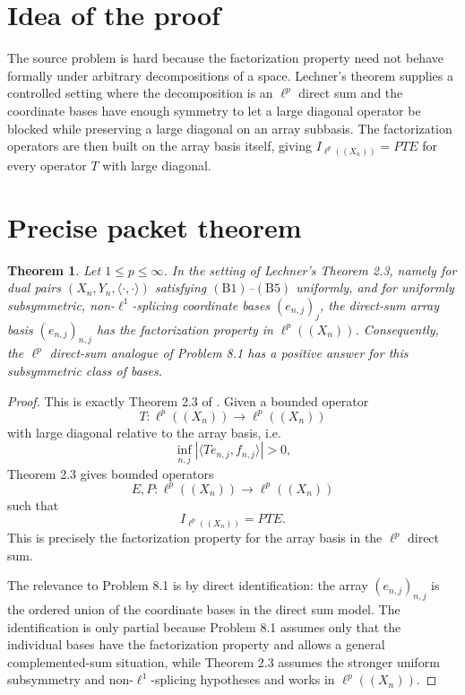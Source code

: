 \documentclass[11pt]{article}
\newtheorem{theorem}{Theorem}
\begin{document}
\section*{Idea of the proof}

The source problem is hard because the factorization property need not behave
formally under arbitrary decompositions of a space.  Lechner's theorem supplies
a controlled setting where the decomposition is an $\ell^p$ direct sum and the
coordinate bases have enough symmetry to let a large diagonal operator be
blocked while preserving a large diagonal on an array subbasis.  The
factorization operators are then built on the array basis itself, giving
$I_{\ell^p((X_n))}=PTE$ for every operator $T$ with large diagonal.

\section*{Precise packet theorem}

\begin{theorem}
Let $1\leq p\leq\infty$.  In the setting of Lechner's Theorem 2.3, namely for
dual pairs $(X_n,Y_n,\langle\cdot,\cdot\rangle)$ satisfying
$(\mathrm{B1})$--$(\mathrm{B5})$ uniformly, and for uniformly subsymmetric,
non-$\ell^1$-splicing coordinate bases $(e_{n,j})_j$, the direct-sum array
basis $(e_{n,j})_{n,j}$ has the factorization property in $\ell^p((X_n))$.
Consequently, the $\ell^p$ direct-sum analogue of Problem 8.1 has a positive
answer for this subsymmetric class of bases.
\end{theorem}

\begin{proof}
This is exactly Theorem 2.3 of \cite{LechnerSubsymmetric}.  Given a bounded
operator
\[
  T:\ell^p((X_n))\longrightarrow \ell^p((X_n))
\]
with large diagonal relative to the array basis, i.e.
\[
  \inf_{n,j} |\langle T e_{n,j},f_{n,j}\rangle|>0,
\]
Theorem 2.3 gives bounded operators
\[
  E,P:\ell^p((X_n))\longrightarrow \ell^p((X_n))
\]
such that
\[
  I_{\ell^p((X_n))}=PTE.
\]
This is precisely the factorization property for the array basis in the
$\ell^p$ direct sum.

The relevance to Problem 8.1 is by direct identification: the array
$(e_{n,j})_{n,j}$ is the ordered union of the coordinate bases in the direct
sum model.  The identification is only partial because Problem 8.1 assumes
only that the individual bases have the factorization property and allows a
general complemented-sum situation, while Theorem 2.3 assumes the stronger
uniform subsymmetry and non-$\ell^1$-splicing hypotheses and works in
$\ell^p((X_n))$.
\end{proof}
\end{document}
